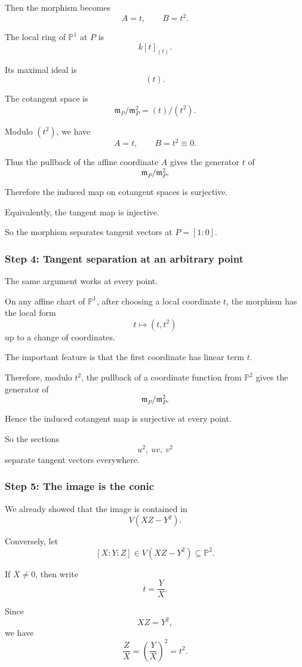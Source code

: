 \documentclass[12pt,a4paper]{article}
\theoremstyle{notespace}
\begin{document}
Then the morphism becomes
\[
A=t,
\qquad
B=t^2.
\]

The local ring of \(\mathbb P^1\) at \(P\) is
\[
k[t]_{(t)}.
\]

Its maximal ideal is
\[
(t).
\]

The cotangent space is
\[
\mathfrak m_P/\mathfrak m_P^2=(t)/(t^2).
\]

Modulo \((t^2)\), we have
\[
A=t,
\qquad
B=t^2\equiv0.
\]

Thus the pullback of the affine coordinate \(A\) gives the generator \(t\) of
\[
\mathfrak m_P/\mathfrak m_P^2.
\]

Therefore the induced map on cotangent spaces is surjective.

Equivalently, the tangent map is injective.

So the morphism separates tangent vectors at \(P=[1:0]\).

\subsubsection*{Step 4: Tangent separation at an arbitrary point}

The same argument works at every point.

On any affine chart of \(\mathbb P^1\), after choosing a local coordinate
\(t\), the morphism has the local form
\[
t\longmapsto (t,t^2)
\]
up to a change of coordinates.

The important feature is that the first coordinate has linear term \(t\).

Therefore, modulo \(t^2\), the pullback of a coordinate function from
\(\mathbb P^2\) gives the generator of
\[
\mathfrak m_P/\mathfrak m_P^2.
\]

Hence the induced cotangent map is surjective at every point.

So the sections
\[
u^2,\ uv,\ v^2
\]
separate tangent vectors everywhere.

\subsubsection*{Step 5: The image is the conic}

We already showed that the image is contained in
\[
V(XZ-Y^2).
\]

Conversely, let
\[
[X:Y:Z]\in V(XZ-Y^2)\subseteq \mathbb P^2.
\]

If \(X\neq0\), then write
\[
t=\frac YX.
\]

Since
\[
XZ=Y^2,
\]
we have
\[
\frac ZX=\left(\frac YX\right)^2=t^2.
\]
\end{document}
